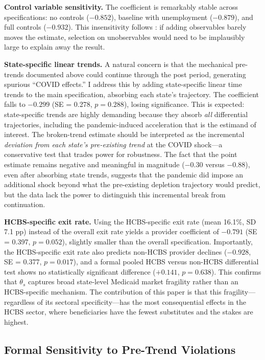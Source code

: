 \documentclass[12pt]{article}
\begin{document}
\textbf{Control variable sensitivity.} The coefficient is remarkably stable across specifications: no controls ($-0.852$), baseline with unemployment ($-0.879$), and full controls ($-0.932$). This insensitivity follows \citet{oster2019}: if adding observables barely moves the estimate, selection on unobservables would need to be implausibly large to explain away the result.

\textbf{State-specific linear trends.} A natural concern is that the mechanical pre-trends documented above could continue through the post period, generating spurious ``COVID effects.'' I address this by adding state-specific linear time trends to the main specification, absorbing each state's trajectory. The coefficient falls to $-0.299$ (SE = 0.278, $p = 0.288$), losing significance. This is expected: state-specific trends are highly demanding because they absorb \emph{all} differential trajectories, including the pandemic-induced acceleration that is the estimand of interest. The broken-trend estimate should be interpreted as the incremental \emph{deviation from each state's pre-existing trend} at the COVID shock---a conservative test that trades power for robustness. The fact that the point estimate remains negative and meaningful in magnitude ($-0.30$ versus $-0.88$), even after absorbing state trends, suggests that the pandemic did impose an additional shock beyond what the pre-existing depletion trajectory would predict, but the data lack the power to distinguish this incremental break from continuation.

\textbf{HCBS-specific exit rate.} Using the HCBS-specific exit rate (mean 16.1\%, SD 7.1 pp) instead of the overall exit rate yields a provider coefficient of $-0.791$ (SE = 0.397, $p = 0.052$), slightly smaller than the overall specification. Importantly, the HCBS-specific exit rate also predicts non-HCBS provider declines ($-0.928$, SE = 0.377, $p = 0.017$), and a formal pooled HCBS versus non-HCBS differential test shows no statistically significant difference ($+0.141$, $p = 0.638$). This confirms that $\theta_s$ captures broad state-level Medicaid market fragility rather than an HCBS-specific mechanism. The contribution of this paper is that this fragility---regardless of its sectoral specificity---has the most consequential effects in the HCBS sector, where beneficiaries have the fewest substitutes and the stakes are highest.

\subsection{Formal Sensitivity to Pre-Trend Violations}
\end{document}
